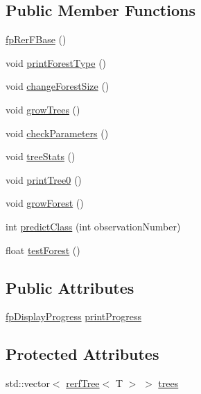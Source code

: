 \subsection*{Public Member Functions}
\begin{DoxyCompactItemize}
\item 
\hyperlink{classfp_1_1fpRerFBase_a3c48a1913e8affa4a4a3b2373207dbd4}{fp\+Rer\+F\+Base} ()
\item 
void \hyperlink{classfp_1_1fpRerFBase_ade8132388aa51aca41c80986003070e4}{print\+Forest\+Type} ()
\item 
void \hyperlink{classfp_1_1fpRerFBase_a4aa9be48cadab132857ea9d9da18fe8a}{change\+Forest\+Size} ()
\item 
void \hyperlink{classfp_1_1fpRerFBase_a5faf8bb9221d903880e0bd6660ea4d0d}{grow\+Trees} ()
\item 
void \hyperlink{classfp_1_1fpRerFBase_ae458c0b2743862b693ded729bf00b218}{check\+Parameters} ()
\item 
void \hyperlink{classfp_1_1fpRerFBase_ad9983abf38c0cb799ed490129508d42e}{tree\+Stats} ()
\item 
void \hyperlink{classfp_1_1fpRerFBase_af55265f8a05b0dd1aab826738cefd628}{print\+Tree0} ()
\item 
void \hyperlink{classfp_1_1fpRerFBase_a0205440403a691b7644a6af0ef796d7a}{grow\+Forest} ()
\item 
int \hyperlink{classfp_1_1fpRerFBase_a73ece66e774ad5f1a450f1422626947f}{predict\+Class} (int observation\+Number)
\item 
float \hyperlink{classfp_1_1fpRerFBase_a0ea48ea24a8213e49e18b6f24ab45508}{test\+Forest} ()
\end{DoxyCompactItemize}
\subsection*{Public Attributes}
\begin{DoxyCompactItemize}
\item 
\hyperlink{classfp_1_1fpDisplayProgress}{fp\+Display\+Progress} \hyperlink{classfp_1_1fpRerFBase_a539e79a960846182fc49420d79896ba1}{print\+Progress}
\end{DoxyCompactItemize}
\subsection*{Protected Attributes}
\begin{DoxyCompactItemize}
\item 
std\+::vector$<$ \hyperlink{classfp_1_1rerfTree}{rerf\+Tree}$<$ T $>$ $>$ \hyperlink{classfp_1_1fpRerFBase_a6c2f12312e64e5234fc53741f1bfbe96}{trees}
\end{DoxyCompactItemize}



